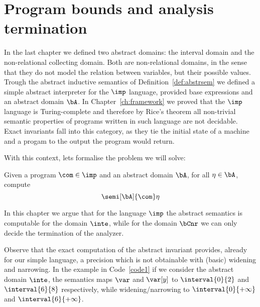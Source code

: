 \chapter{Program bounds and analysis termination}\label{ch:axiomatized}

In the last chapter we defined two abstract domains: the interval
domain and the non-relational collecting domain. Both are
non-relational domains, in the sense that they do not model the
relation between variables, but their possible values. Trough the
abstract inductive semantics of Definition~\ref{def:abstrsem} we
defined a simple abstract interpreter for the \(\imp\) language,
provided base expressions and an abstract domain \(\bA\). In
Chapter~\ref{ch:framework} we proved that the \(\imp\) language is
Turing-complete and therefore by Rice's theorem all non-trivial
semantic properties of programs written in such language are not
decidable.  
Exact invariants fall into this category, as they tie the initial
state of a machine and a progam to the output the program would
return.

With this context, lets formalise the problem we will solve:

\begin{problem}\label{problem1}
  Given a program \(\com\in \imp\) and an abstract domain \(\bA\), for
  all \(\eta \in \bA\), compute
  \begin{equation*}
    \semi[\bA]{\com} \eta
  \end{equation*}
\end{problem}

In this chapter we argue that for the language \(\imp\) the abstract
semantics is computable for the domain \(\inte\), while for the domain
\(\bCnr\) we can only decide the termination of the analyzer.

\medskip

Observe that the exact computation of the abstract invariant provides,
already for our simple language, a precision which is not obtainable
with (basic) widening and narrowing. In the example in
Code~\ref{code1} if we consider the abstract domain \(\inte\), the
semantics maps \(\var\) and \(\var[y]\) to \(\interval{0}{2}\) and
\(\interval{6}{8}\) respectively, while widening/narrowing to
\(\interval{0}{+\infty}\) and \(\interval{6}{+\infty}\).

